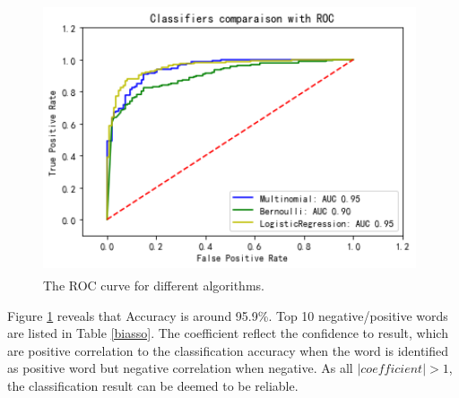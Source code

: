 \documentclass[12pt]{article}%
\begin{document}
\begin{figure}[H]
	\centering
	\includegraphics[height=8cm,width=11cm]{111.png}%
	\caption{The ROC curve for different algorithms.}\label{llll}%
\end{figure}

 Figure \ref{llll} reveals that Accuracy is around 95.9\%. Top 10 negative/positive words are listed in Table \ref{biasso}. The coefficient reflect the confidence to result, which are positive correlation to the classification accuracy when the word is identified as positive word but negative correlation when negative. As all $ \left | coefficient \right |>1 $, the classification result can be deemed to be reliable.

\end{document}
